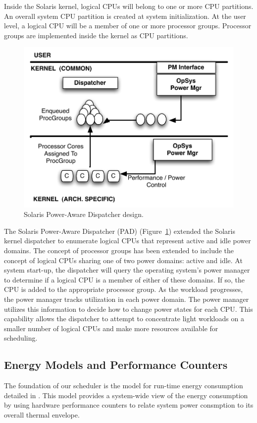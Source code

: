 \documentclass[]{sig-alternate-hotpower09}
\begin{document}
Inside the Solaris kernel, logical CPUs will belong to one or more CPU
partitions.  An overall system CPU partition is created at system
initialization.  At the user level, a logical CPU will be a member of
one or more processor groups.  Processor groups are implemented inside
the kernel as CPU partitions.
\begin{figure}
  \centering
  \includegraphics[scale=0.40]{padarch.pdf}
  \caption{Solaris Power-Aware Dispatcher design.}
  \label{fig:padarch}
\end{figure}
The Solaris Power-Aware Dispatcher (PAD) (Figure~\ref{fig:padarch})
\cite{Sun2009} extended the Solaris kernel dispatcher to enumerate
logical CPUs that represent active and idle power domains.  The concept
of processor groups has been extended to include the concept of logical
CPUs sharing one of two power domains: active and idle.  At system
start-up, the dispatcher will query the operating system's power manager
to determine if a logical CPU is a member of either of these domains.
If so, the CPU is added to the appropriate processor group.  As the
workload progresses, the power manager tracks utilization in each power
domain.  The power manager utilizes this information to decide how to
change power states for each CPU.  This capability allows the dispatcher
to attempt to concentrate light workloads on a smaller number of logical
CPUs and make more resources available for scheduling.

\subsection{Energy Models and Performance Counters}
\label{sec:energymodels}
The foundation of our scheduler is the model for run-time energy
consumption detailed in \cite{Lewis2008}. This model provides a
system-wide view of the energy consumption by using hardware performance
counters to relate system power consmption to its overall thermal
envelope.
\end{document}
